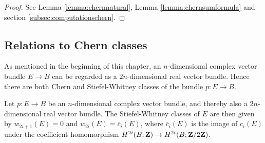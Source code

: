 \documentclass[a4paper,openany]{scrbook}
\begin{document}
\begin{proof}
 See Lemma \ref{lemma:chernnatural}, Lemma \ref{lemma:chernsumformula} and section \ref{subsec:computationschern}.
\end{proof}

\subsection{Relations to Chern classes}\label{subsec:relationstochern}
As mentioned in the beginning of this chapter, an $n$-dimensional complex vector bundle $E\to B$ can be regarded as a $2n$-dimensional real vector bundle. Hence there are both Chern and Stiefel-Whitney classes of the bundle $p:E\to B$.

\begin{thm}
Let $p:E\to B$ be an $n$-dimensional complex vector bundle, and thereby also a $2n$-dimensional real vector bundle. The Stiefel-Whitney classes of $E$ are then given by $w_{2i+1}(E)=0$ and $w_{2i}(E)=\bar c_i(E)$, where $\bar c_i(E)$ is the image of $c_i(E)$ under the coefficient homomorphism $H^{2i}(B;\mathbf Z)\to H^{2i}(B;\mathbf Z/2\mathbf Z)$.
\end{thm}
\end{document}
